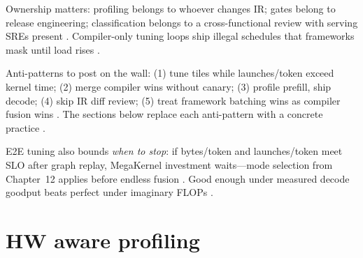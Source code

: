 Ownership matters: profiling belongs to whoever changes IR; gates belong to release engineering; classification belongs to a cross-functional review with serving SREs present \citep{patel2025llminference,kwon2023vllm,yirage2026,chen2020compilerbasedhardw,memoryfloor2026,taxbreak2026,liu2024deepseekv3,amd2024aie,dlbook,semianalysis2024tma,amd2024xdna,dao2022flashattention,dao2023flashdecoding,nvidia2024cudagraphs,nvidia2022hopper}. Compiler-only tuning loops ship illegal schedules that frameworks mask until load rises \citep{kwon2023vllm,patel2025llminference,taxbreak2026,memoryfloor2026,yirage2026,chen2020compilerbasedhardw,liu2024deepseekv3,amd2024aie,dlbook,semianalysis2024tma,amd2024xdna,dao2022flashattention,dao2023flashdecoding,nvidia2024cudagraphs,nvidia2022hopper}.

Anti-patterns to post on the wall: (1) tune tiles while launches/token exceed kernel time; (2) merge compiler wins without canary; (3) profile prefill, ship decode; (4) skip IR diff review; (5) treat framework batching wins as compiler fusion wins \citep{taxbreak2026,memoryfloor2026,patel2025llminference,kwon2023vllm,yirage2026,chen2020compilerbasedhardw,liu2024deepseekv3,amd2024aie,dlbook,semianalysis2024tma,amd2024xdna,dao2022flashattention,dao2023flashdecoding,nvidia2024cudagraphs,nvidia2022hopper}. The sections below replace each anti-pattern with a concrete practice \citep{yirage2026,chen2020compilerbasedhardw,patel2025llminference,memoryfloor2026,taxbreak2026,amd2024aie,dlbook,kwon2023vllm,liu2024deepseekv3,semianalysis2024tma,amd2024xdna,dao2022flashattention,dao2023flashdecoding,nvidia2024cudagraphs,nvidia2022hopper}.

E2E tuning also bounds \emph{when to stop}: if bytes/token and launches/token meet SLO after graph replay, MegaKernel investment waits---mode selection from Chapter~12 applies before endless fusion \citep{nvidia2024cudagraphs,memoryfloor2026,yirage2026,chen2020compilerbasedhardw,taxbreak2026,patel2025llminference,kwon2023vllm,liu2024deepseekv3,amd2024aie,dlbook,semianalysis2024tma,amd2024xdna,dao2022flashattention,dao2023flashdecoding,nvidia2024cudagraphs,nvidia2022hopper}. Good enough under measured decode goodput beats perfect under imaginary FLOPs \citep{patel2025llminference,dlbook,memoryfloor2026,taxbreak2026,yirage2026,chen2020compilerbasedhardw,amd2024aie,kwon2023vllm,liu2024deepseekv3,semianalysis2024tma,amd2024xdna,dao2022flashattention,dao2023flashdecoding,nvidia2024cudagraphs,nvidia2022hopper}.

\section{HW aware profiling}
\label{sec:ch22_hw_aware_profiling}

